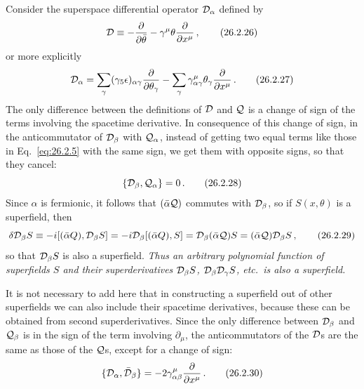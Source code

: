 Consider the superspace differential operator $\mathcal{D}_\alpha$ defined by
\begin{equation}
  \mathcal{D}\equiv
  -\frac{\partial}{\partial\bar\theta}
  -\gamma^\mu\theta\frac{\partial}{\partial x^\mu}\,,
  \tag{26.2.26}\label{eq:26.2.26}
\end{equation}
or more explicitly
\begin{equation}
  \mathcal{D}_\alpha
  =\sum_\gamma(\gamma_5\epsilon)_{\alpha\gamma}
    \frac{\partial}{\partial\theta_\gamma}
  -\sum_\gamma\gamma^\mu_{\alpha\gamma}\theta_\gamma
    \frac{\partial}{\partial x^\mu}\,.
  \tag{26.2.27}\label{eq:26.2.27}
\end{equation}
The only difference between the definitions of $\mathcal{D}$ and $\mathcal{Q}$ is a
change of sign of the terms involving the spacetime derivative. In
consequence of this change of sign, in the anticommutator of $\mathcal{D}_\beta$
with $\mathcal{Q}_\alpha$, instead of getting two equal terms like those in
Eq.~\eqref{eq:26.2.5} with the same sign, we get them with opposite signs, so
that they cancel:
\begin{equation}
  \{\mathcal{D}_\beta,\mathcal{Q}_\alpha\}=0\,.
  \tag{26.2.28}\label{eq:26.2.28}
\end{equation}
Since $\alpha$ is fermionic, it follows that $(\bar\alpha\mathcal{Q})$ commutes
with $\mathcal{D}_\beta$, so if $S(x,\theta)$ is a superfield, then
\begin{equation}
  \delta\mathcal{D}_\beta S
  \equiv-i[(\bar\alpha Q),\mathcal{D}_\beta S]
  =-i\mathcal{D}_\beta[(\bar\alpha Q),S]
  =\mathcal{D}_\beta(\bar\alpha\mathcal{Q})S
  =(\bar\alpha\mathcal{Q})\mathcal{D}_\beta S\,,
  \tag{26.2.29}\label{eq:26.2.29}
\end{equation}
so that $\mathcal{D}_\beta S$ is also a superfield.
\emph{Thus an arbitrary polynomial function of superfields $S$ and their
superderivatives $\mathcal{D}_\beta S$, $\mathcal{D}_\beta\mathcal{D}_\gamma S$, etc.\
is also a superfield.}

It is not necessary to add here that in constructing a superfield out of other
superfields we can also include their spacetime derivatives, because these can
be obtained from second superderivatives. Since the only difference between
$\mathcal{D}_\beta$ and $\mathcal{Q}_\beta$ is in the sign of the term involving
$\partial_\mu$, the anticommutators of the $\mathcal{D}$s are the same as those of
the $\mathcal{Q}$s, except for a change of sign:
\begin{equation}
  \{\mathcal{D}_\alpha,\bar{\mathcal{D}}_\beta\}
  =-2\gamma^\mu_{\alpha\beta}\frac{\partial}{\partial x^\mu}\,.
  \tag{26.2.30}\label{eq:26.2.30}
\end{equation}

